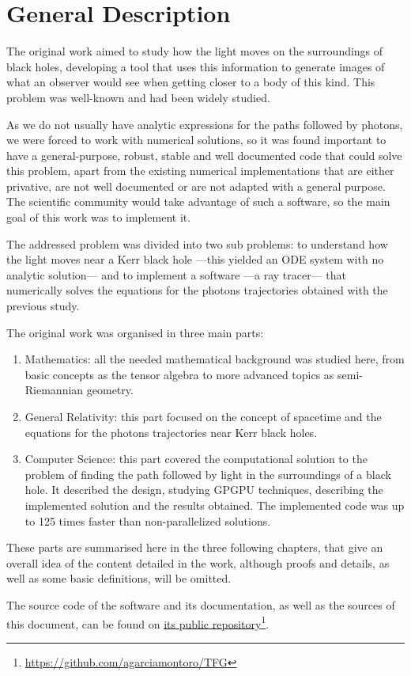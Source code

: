 \chapter{General Description}

The original work aimed to study how the light moves on the surroundings of black holes, developing a tool that uses this information to generate images of what an observer would see when getting closer to a body of this kind. This problem was well-known \cite{oneill83} \cite{oneill95} and had been widely studied.

As we do not usually have analytic expressions for the paths followed by photons, we were forced to work with numerical solutions, so it was found important to have a general-purpose, robust, stable and well documented code that could solve this problem, apart from the existing numerical implementations \cite{thorne15} \cite{chan13} that are either privative, are not well documented or are not adapted with a general purpose. The scientific community would take advantage of such a software, so the main goal of this work was to implement it.

The addressed problem was divided into two sub problems: to understand how the light moves near a Kerr black hole ---this yielded an \ac{ODE} system with no analytic solution--- and to implement a software ---a ray tracer--- that numerically solves the equations for the photons trajectories obtained with the previous study.

The original work was organised in three main parts:
\begin{enumerate}
	\item Mathematics: all the needed mathematical background was studied here, from basic concepts as the tensor algebra to more advanced topics as semi-Riemannian geometry.
	\item General Relativity: this part focused on the concept of spacetime and the equations for the photons trajectories near Kerr black holes.
	\item Computer Science: this part covered the computational solution to the problem of finding the path followed by light in the surroundings of a black hole. It described the design, studying \ac{GPGPU} techniques, describing the implemented solution and the results obtained. The implemented code was up to 125 times faster than non-parallelized solutions.
\end{enumerate}

These parts are summarised here in the three following chapters, that give an overall idea of the content detailed in the work, although proofs and details, as well as some basic definitions, will be omitted.

The source code of the software and its documentation, as well as the sources of this document, can be found on \href{https://github.com/agarciamontoro/TFG}{its public repository}\footnote{\url{https://github.com/agarciamontoro/TFG}}.